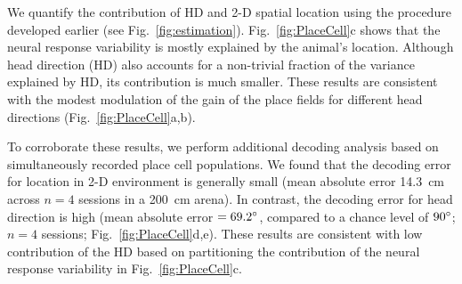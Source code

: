 \documentclass[11pt]{article}
\begin{document}



We quantify the contribution of HD and 2-D spatial location using the procedure developed earlier (see Fig.~\ref{fig:estimation}). 
Fig.~\ref{fig:PlaceCell}c shows that the neural response variability is mostly explained by the animal's location. Although head direction (HD) also accounts for a non-trivial fraction of the variance explained by HD, its contribution is much smaller. These results are consistent with the modest modulation of the gain of the place fields for different head directions (Fig.~\ref{fig:PlaceCell}a,b).


To corroborate these results, we perform additional decoding analysis based on simultaneously recorded place cell populations. We found that the decoding error for location in 2-D environment is generally small (mean absolute error 14.3~cm across $n=4$ sessions in a 200~cm arena). In contrast, the decoding error for head direction is high (mean absolute error $= 69.2\degree$, compared to a chance level of $90\degree$; $n=4$ sessions; Fig.~\ref{fig:PlaceCell}d,e). These results are consistent with low contribution of the HD based on partitioning the contribution of the neural response variability in Fig.~\ref{fig:PlaceCell}c.
\end{document}
